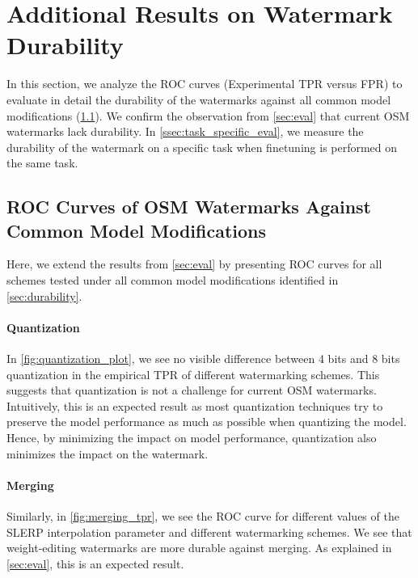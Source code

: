 \section{Additional Results on Watermark Durability}
\label{sec:deep_dives}

In this section, we analyze the ROC curves (Experimental TPR versus FPR) to evaluate in detail the durability of the watermarks against all common model modifications (\cref{ssec:roc_curves}).  
We confirm the observation from \cref{sec:eval} that current OSM watermarks lack durability. 
In \cref{ssec:task_specific_eval}, we measure the durability of the watermark on a specific task when finetuning is performed on the same task.  

\subsection{ROC Curves of OSM Watermarks Against Common Model Modifications}
\label{ssec:roc_curves}

Here, we extend the results from \cref{sec:eval} by presenting ROC curves for all schemes tested under all common model modifications identified in \cref{sec:durability}. 



\paragraph{Quantization}
In \cref{fig:quantization_plot}, we see no visible difference between 4 bits and 8 bits quantization in the empirical TPR of different watermarking schemes.
This suggests that quantization is not a challenge for current OSM watermarks.
Intuitively, this is an expected result as most quantization techniques try to preserve the model performance as much as possible when quantizing the model.
Hence, by minimizing the impact on model performance, quantization also minimizes the impact on the watermark.



\paragraph{Merging}
Similarly, in \cref{fig:merging_tpr}, we see the ROC curve for different values of the \textsc{SLERP} interpolation parameter and different watermarking schemes.
We see that weight-editing watermarks are more durable against merging.
As explained in \cref{sec:eval}, this is an expected result.

